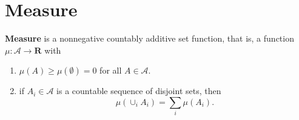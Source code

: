 \section{Measure}

\begin{definition}[Measure]
    \textbf{Measure} is a nonnegative countably additive set function, that is, a function $\mu:\mathcal{A}\rightarrow\mathbf{R}$ with
    \begin{enumerate}
        \item $\mu(A)\geq\mu(\emptyset)=0$ for all $A\in\mathcal{A}$.
        \item if $A_i\in\mathcal{A}$ is a countable sequence of disjoint sets, then $$\mu(\cup_iA_i)=\sum_i\mu(A_i).$$
    \end{enumerate}
\end{definition}





